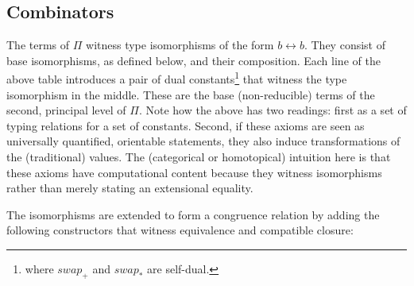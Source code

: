 \documentclass[authoryear,preprint]{sigplanconf}
\newcommand{\iso}{\leftrightarrow}
\newcommand{\swapp}{\mathit{swap}_+}
\newcommand{\swapt}{\mathit{swap}_*}
\begin{document}
\subsection{Combinators} 

The terms of $\Pi$ witness type isomorphisms of the form $b \iso b$. They
consist of base isomorphisms, as defined below, and their composition. Each
line of the above table introduces a pair of dual constants\footnote{where
  $\swapp$ and $\swapt$ are self-dual.} that witness the type isomorphism in
the middle.  These are the base (non-reducible) terms of the second,
principal level of $\Pi$. Note how the above has two readings: first as a set
of typing relations for a set of constants. Second, if these axioms are seen
as universally quantified, orientable statements, they also induce
transformations of the (traditional) values. The (categorical or homotopical)
intuition here is that these axioms have computational content because they
witness isomorphisms rather than merely stating an extensional equality.

The isomorphisms are extended to form a congruence relation by adding the
following constructors that witness equivalence and compatible closure:
\end{document}
